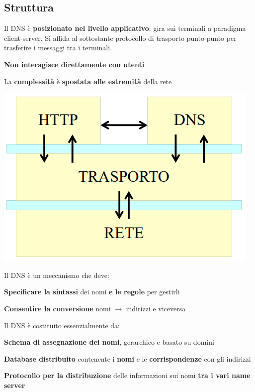 \documentclass[10pt]{article}
\begin{document}
\subsection{Struttura}
Il DNS è \textbf{posizionato nel livello applicativo}: gira sui terminali a paradigma client-server. Si affida al sottostante protocollo di trasporto punto-punto per trasferire i messaggi tra i terminali.
\begin{list}{}{}
\item \textbf{Non interagisce direttamente con utenti}
\item La \textbf{complessità} è \textbf{spostata alle estremità} della rete
\end{list}
\begin{multicols}{2}
\includegraphics[scale=0.7]{schemadns.png}
\columnbreak

Il DNS è un meccanismo che deve:
\begin{list}{}{}
\item \textbf{Specificare la sintassi} dei nomi \textbf{e le regole} per gestirli
\item \textbf{Consentire la conversione} nomi $\rightarrow$ indirizzi e viceversa
\end{list}

Il DNS è costituito essenzialmente da:
\begin{list}{}{}
\item \textbf{Schema di assegnazione dei nomi}, gerarchico e basato su domini
\item \textbf{Database distribuito} contenente i \textbf{nomi} e le \textbf{corrispondenze} con gli indirizzi
\item \textbf{Protocollo per la distribuzione} delle informazioni sui nomi \textbf{tra i vari name server}
\end{list}
\end{multicols}
\pagebreak
\end{document}
